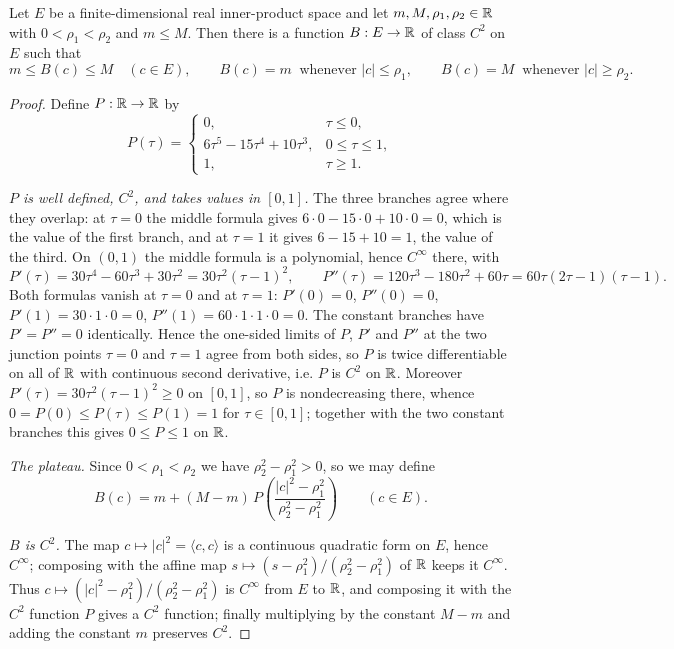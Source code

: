 \begin{lemma}
Let $E$ be a finite-dimensional real inner-product space and let
$m,M,\rho_1,\rho_2\in\mathbb{R}$ with $0<\rho_1<\rho_2$ and $m\le M$. Then there is a
function $B:E\to\mathbb{R}$ of class $C^2$ on $E$ such that
\[
  m\le B(c)\le M\quad(c\in E),\qquad
  B(c)=m\ \text{ whenever }|c|\le\rho_1,\qquad
  B(c)=M\ \text{ whenever }|c|\ge\rho_2 .
\]
\end{lemma}
\begin{proof}
Define $P:\mathbb{R}\to\mathbb{R}$ by
\[
  P(\tau)=\begin{cases}0,&\tau\le0,\\
    6\tau^5-15\tau^4+10\tau^3,&0\le\tau\le1,\\
    1,&\tau\ge1.\end{cases}
\]

\emph{$P$ is well defined, $C^2$, and takes values in $[0,1]$.} The three
branches agree where they overlap: at $\tau=0$ the middle formula gives
$6\cdot0-15\cdot0+10\cdot0=0$, which is the value of the first branch, and at
$\tau=1$ it gives $6-15+10=1$, the value of the third. On $(0,1)$ the middle
formula is a polynomial, hence $C^\infty$ there, with
\[
  P'(\tau)=30\tau^4-60\tau^3+30\tau^2=30\tau^2(\tau-1)^2,\qquad
  P''(\tau)=120\tau^3-180\tau^2+60\tau=60\tau(2\tau-1)(\tau-1).
\]
Both formulas vanish at $\tau=0$ and at $\tau=1$: $P'(0)=0$, $P''(0)=0$,
$P'(1)=30\cdot1\cdot0=0$, $P''(1)=60\cdot1\cdot1\cdot0=0$. The constant branches
have $P'=P''=0$ identically. Hence the one-sided limits of $P$, $P'$ and $P''$
at the two junction points $\tau=0$ and $\tau=1$ agree from both sides, so $P$
is twice differentiable on all of $\mathbb{R}$ with continuous second derivative, i.e.
$P$ is $C^2$ on $\mathbb{R}$. Moreover $P'(\tau)=30\tau^2(\tau-1)^2\ge0$ on $[0,1]$, so
$P$ is nondecreasing there, whence $0=P(0)\le P(\tau)\le P(1)=1$ for
$\tau\in[0,1]$; together with the two constant branches this gives
$0\le P\le1$ on $\mathbb{R}$.

\emph{The plateau.} Since $0<\rho_1<\rho_2$ we have
$\rho_2^2-\rho_1^2>0$, so we may define
\[
  B(c)=m+(M-m)\,P\!\left(\frac{|c|^2-\rho_1^2}{\rho_2^2-\rho_1^2}\right)
  \qquad(c\in E).
\]

\emph{$B$ is $C^2$.} The map $c\mapsto|c|^2=\langle c,c\rangle$ is a continuous
quadratic form on $E$, hence $C^\infty$; composing with the affine map
$s\mapsto(s-\rho_1^2)/(\rho_2^2-\rho_1^2)$ of $\mathbb{R}$ keeps it $C^\infty$. Thus
$c\mapsto(|c|^2-\rho_1^2)/(\rho_2^2-\rho_1^2)$ is $C^\infty$ from $E$ to $\mathbb{R}$,
and composing it with the $C^2$ function $P$ gives a $C^2$ function; finally
multiplying by the constant $M-m$ and adding the constant $m$ preserves
$C^2$.


\end{proof}
